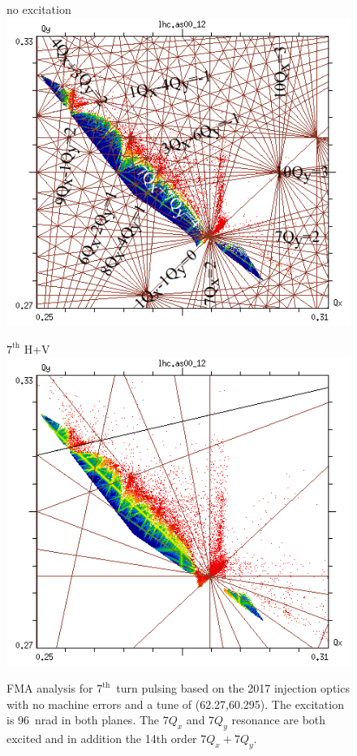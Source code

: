 \documentclass[%
 reprint,
 amsmath,amssymb,
 aps,
prstab,
]{revtex4-1}
\begin{document}
\begin{figure}[h]
	\begin{minipage}[t]{0.49\linewidth}
		\centering
		no excitation
		\includegraphics[width=1.0\linewidth]{2017injnocolc15o+19_6noerru_dp0_ord14_annotate.png}
	\end{minipage}
	\begin{minipage}[t]{0.49\linewidth}
		\centering
		$7^{\mathrm{th}}$ H+V
		\includegraphics[width=1.0\linewidth]{2017injnocolc15o+19_6noerrut7skhv_dp0_ord7.png}
	\end{minipage}	
	\caption{\label{fig:7th2017fma} FMA analysis for $7^{\mathrm{th}}$~turn pulsing based on the 2017 injection optics with no machine errors and a tune of (62.27,60.295). The excitation is 96~nrad in both planes. The $7Q_x$ and $7Q_y$ resonance are both excited and in addition the 14th order $7Q_x+7Q_y$.}
\end{figure}
\end{document}

